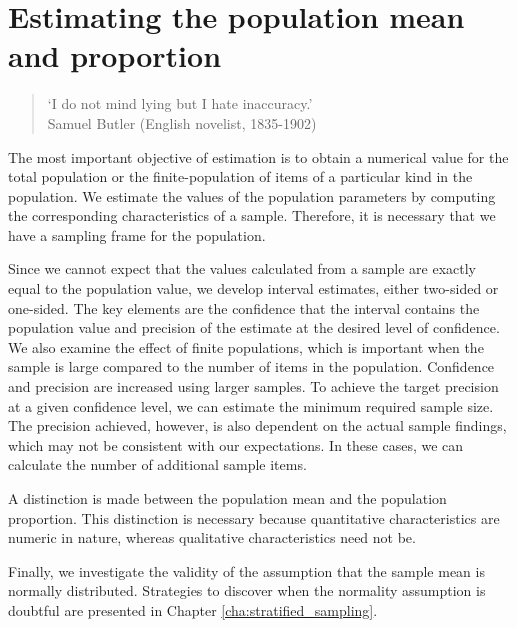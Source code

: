 
\chapter{Estimating the population mean and proportion}
\label{cha:estimation}

\begin{quote}
`I do not mind lying but I hate inaccuracy.'\\
Samuel Butler (English novelist, 1835-1902)
\end{quote}


The most important objective of estimation is to obtain a numerical value for the total population or the finite-population of items of a particular kind in the population. We estimate the values of the population parameters by computing the corresponding characteristics of a sample. Therefore, it is necessary that we have a sampling frame for the population. 

Since we cannot expect that the values calculated from a sample are exactly equal to the population value, we develop interval estimates, either two-sided or one-sided. The key elements are the confidence that the interval contains the population value and precision of the estimate at the desired level of confidence. We also examine the effect of finite populations, which is important when the sample is large compared to the number of items in the population. Confidence and precision are increased using larger samples. To achieve the target precision at a given confidence level, we can estimate the minimum required sample size. The precision achieved, however, is also dependent on the actual sample findings, which may not be consistent with our expectations. In these cases, we can calculate the number of additional sample items.

A distinction is made between the population mean and the population proportion. This distinction is necessary because quantitative characteristics are numeric in nature, whereas qualitative characteristics need not be.

Finally, we investigate the validity of the assumption that the sample mean is normally distributed. Strategies to discover when the normality assumption is doubtful are presented in Chapter \ref{cha:stratified_sampling}.

